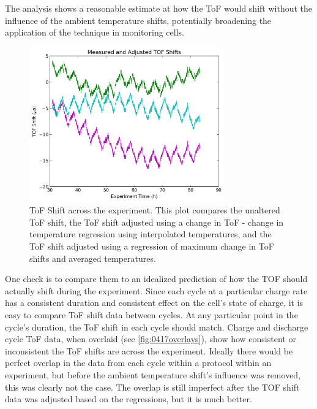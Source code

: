 The analysis shows a reasonable estimate at how the ToF would shift without the influence of the ambient temperature shifts, potentially broadening the application of the technique in monitoring cells.
\begin{figure}[t]\label{fig:0417tofshiftadj}
\includegraphics[width=0.75\textwidth]{Thesis/0417tofshiftadj.png}
\centering
\caption{ToF Shift across the experiment. This plot compares the unaltered ToF shift, the ToF shift adjusted using a change in ToF - change in temperature regression using interpolated temperatures, and the ToF shift adjusted using a regression of maximum change in ToF shifts and averaged temperatures.}
\end{figure}

One check is to compare them to an idealized prediction of how the TOF should actually shift during the experiment. 
Since each cycle at a particular charge rate has a consistent duration and consistent effect on the cell's state of charge, it is easy to compare ToF shift data between cycles. 
At any particular point in the cycle's duration, the ToF shift in each cycle should match. Charge and discharge cycle ToF data, when overlaid (see \hyperref[fig:0417overlays]{\cref{fig:0417overlays}}), show how consistent or inconsistent the ToF shifts are across the experiment.
Ideally there would be perfect overlap in the data from each cycle within a protocol within an experiment, but before the ambient temperature shift's influence was removed, this was clearly not the case. 
The overlap is still imperfect after the TOF shift data was adjusted based on the regressions, but it is much better.

